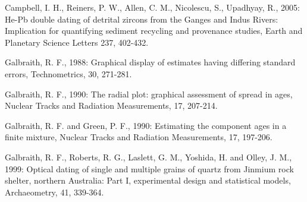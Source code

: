 \documentclass{article}
\begin{document}
\begin{description}

\item Campbell, I. H., Reiners, P. W., Allen, C. M.,
Nicolescu, S., Upadhyay, R., 2005:
He-Pb double dating of detrital zircons from the Ganges and Indus
Rivers: Implication for quantifying sediment recycling and
provenance studies, Earth and Planetary Science Letters 237, 402-432.

\item Galbraith,  R. F., 1988:  Graphical display of  estimates having
  differing standard errors, Technometrics, 30, 271-281.

\item Galbraith, R. F., 1990: The radial plot: graphical assessment of
  spread  in  ages, Nuclear  Tracks  and  Radiation Measurements,  17,
  207-214.

\item Galbraith, R. F. and Green, P. F., 1990: Estimating the component 
ages in a finite mixture, Nuclear Tracks and Radiation Measurements, 17, 
197-206.

\item  Galbraith, R.  F., Roberts,  R.  G., Laslett,  G. M.,  Yoshida,
  H. and  Olley, J.  M., 1999: Optical  dating of single  and multiple
  grains of quartz from Jinmium rock shelter, northern Australia: Part
  I,  experimental design  and statistical  models,  Archaeometry, 41,
  339-364.

\end{description}
\end{document}

